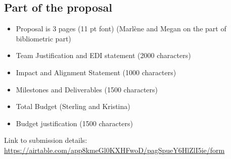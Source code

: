 \documentclass{article}
\begin{document}
\subsection{Part of the proposal}
\begin{itemize}
    \item Proposal is 3 pages (11 pt font) (Marlène and Megan on the part of bibliometric part)
    \item Team Justification and EDI statement (2000 characters)
    \item Impact and Alignment Statement (1000 characters)
    \item Milestones and Deliverables (1500 characters)
    \item Total Budget (Sterling and Kristina)
    \item Budget justification (1500 characters)
\end{itemize}
Link to submission details: \href{https://airtable.com/app8kmeGl0KXHFwoD/pagSpueY6HlZlI5ie/form}{https://airtable.com/app8kmeGl0KXHFwoD/pagSpueY6HlZlI5ie/form}



\end{document}
